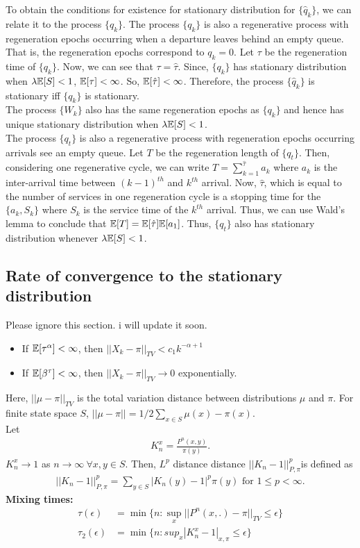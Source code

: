 \documentclass[all-lectures.tex]{subfiles}
\begin{document}
\indent To obtain the conditions for existence for stationary distribution for $\{\hat{q}_k\}$, we can relate it to the process $\{q_k\}$. The process $\{q_k\}$ is also a regenerative process with regeneration epochs occurring when a departure leaves behind an empty queue. That is, the regeneration epochs correspond to $q_k = 0$. Let $\tau$ be the regeneration time of $\{q_k\}$. Now, we can see that $\tau = \hat{\tau}$. Since, $\{q_k\}$ has stationary distribution when $\lambda \mathbb{E}[S] < 1$, $\mathbb{E}[\tau] < \infty$. So, $\mathbb{E}[\hat{\tau}] < \infty$. Therefore, the process $\{\hat{q}_k\}$ is stationary iff $\{q_k\}$ is stationary. \\
\indent The process $\{W_k\}$ also has the same regeneration epochs as $\{q_k\}$ and hence has unique stationary distribution when $\lambda\mathbb{E}[S] < 1$.\\
\indent The process $\{q_t\}$ is also a regenerative process with regeneration epochs occurring arrivals see an empty queue. Let $T$ be the regeneration length of $\{q_t\}$. Then, considering one regenerative cycle, we can write $T = \sum_{k = 1}^{\hat{\tau}} a_k$ where $a_k$ is the inter-arrival time between $(k-1)^{th}$ and $k^{th}$ arrival. Now, $\hat{\tau}$, which is equal to the number of services in one regeneration cycle is a stopping time for the $\{a_k,S_k\}$ where $S_k$ is the service time of the $k^{th}$ arrival. Thus, we can use Wald's lemma to conclude that $\mathbb{E}[T] = \mathbb{E}[\hat{\tau}] \mathbb{E}[a_1]$. Thus, $\{q_t\}$ also has stationary distribution whenever $\lambda\mathbb{E}[S] < 1$.
\subsection{Rate of convergence to the stationary distribution}
{\color{red} Please ignore this section. i will update it soon. }
\begin{itemize}
\item If $\mathbb{E}[\tau^\alpha] < \infty$, then $|| X_k - \pi ||_{TV} < c_1 k^{-\alpha +1}$
\item If $\mathbb{E}[\beta^{\tau}] < \infty$, then $|| X_k - \pi||_{TV} \rightarrow 0 $ exponentially.
\end{itemize}
Here, $||\mu - \pi||_{TV}$ is the total variation distance between distributions $\mu$ and $\pi$. For finite state space $S$, $||\mu - \pi|| = 1/2 \sum_{x\in S} \mu(x) - \pi(x)$. \\
Let 
\begin{align*}
K_n^{x} = \frac{P^n(x,y)}{\pi(y)}.
\end{align*}
$K_n^{x} \rightarrow 1$ as $n \rightarrow \infty \ \forall x,y \in S$. Then, $L^p$ distance distance $||K_n-1||^p_{P,\pi}$is defined as 
\begin{align*}
||K_n-1||^p_{P,\pi} = \sum_{y\in S} |K_n(y)-1|^p \pi(y) \text{ for } 1 \leq p < \infty.
\end{align*}
\textbf{Mixing times:}
\begin{align*}
\tau(\epsilon) &= \min\{n: \sup_x ||P^n(x,.)-\pi||_{TV} \leq \epsilon\} \\
\tau_2(\epsilon) &= \min\{n: sup_x |K_n^x - 1|_{x,\pi} \leq \epsilon\}
\end{align*}
\end{document}
